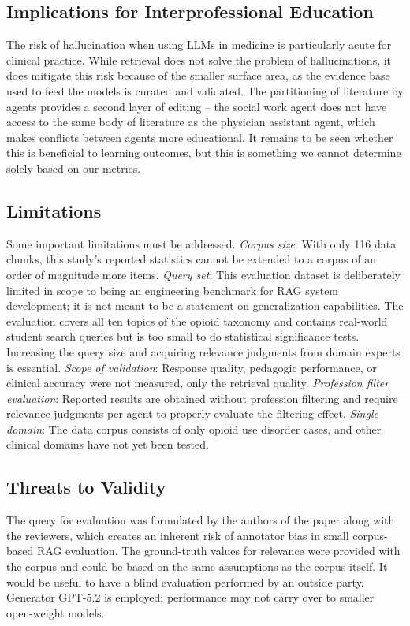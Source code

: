 \documentclass[pdflatex,sn-mathphys-num]{sn-jnl}
\theoremstyle{thmstyleone}
\theoremstyle{thmstyletwo}
\theoremstyle{thmstylethree}
\begin{document}
\subsection{Implications for Interprofessional Education}

The risk of hallucination when using LLMs in medicine is particularly acute for clinical practice. While retrieval does not solve the problem of hallucinations, it does mitigate this risk because of the smaller surface area, as the evidence base used to feed the models is curated and validated. The partitioning of literature by agents provides a second layer of editing – the social work agent does not have access to the same body of literature as the physician assistant agent, which makes conflicts between agents more educational. It remains to be seen whether this is beneficial to learning outcomes, but this is something we cannot determine solely based on our metrics.

\subsection{Limitations}

Some important limitations must be addressed. \textit{Corpus size}: With only 116 data chunks,
this study’s reported statistics cannot be extended to a corpus of an order of magnitude more items. \textit{Query set}: This evaluation dataset is deliberately limited in scope to being an engineering benchmark for RAG system development; it is not meant to be a statement on generalization capabilities. The evaluation covers all ten topics of the opioid taxonomy and contains real-world student search queries but is too small to do statistical significance tests. Increasing the query size and acquiring relevance judgments from domain experts is essential. \textit{Scope of validation}: Response quality, pedagogic performance, or clinical accuracy were not measured, only the retrieval quality. \textit{Profession filter evaluation}: Reported results are obtained without profession
filtering and require relevance judgments per agent to properly evaluate the filtering effect. \textit{Single domain}: The data corpus consists of only opioid use disorder cases, and other clinical domains have not yet been tested.

\subsection{Threats to Validity}

The query for evaluation was formulated by the authors of the paper along with the reviewers, which creates an inherent risk of annotator bias in small corpus-based RAG evaluation. The ground-truth values for relevance were provided with the corpus and could be based on the same assumptions as the corpus itself. It would be useful to have a blind evaluation performed by an outside party. Generator GPT-5.2 is employed; performance may not carry over to smaller open-weight models.
\end{document}
